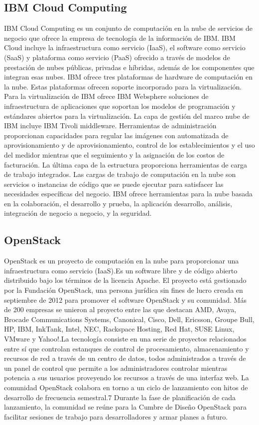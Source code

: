 \subsection{IBM Cloud Computing}
IBM Cloud Computing es un conjunto de computación en la nube de servicios de negocio que ofrece la empresa de tecnología de la información de IBM. IBM Cloud incluye la infraestructura como servicio (IaaS), el software como servicio (SaaS) y plataforma como servicio (PaaS) ofrecido a través de modelos de prestación de nubes públicas, privadas e híbridas, además de los componentes que integran esas nubes.
IBM ofrece tres plataformas de hardware de computación en la nube. Estas plataformas ofrecen soporte incorporado para la virtualización. Para la virtualización de IBM ofrece IBM Websphere soluciones de infraestructura de aplicaciones que soportan los modelos de programación y estándares abiertos para la virtualización.
La capa de gestión del marco nube de IBM incluye IBM Tivoli middleware. Herramientas de administración proporcionan capacidades para regular las imágenes con automatizada de aprovisionamiento y de aprovisionamiento, control de los establecimientos y el uso del medidor mientras que el seguimiento y la asignación de los costos de facturación. La última capa de la estructura proporciona herramientas de carga de trabajo integrados. Las cargas de trabajo de computación en la nube son servicios o instancias de código que se puede ejecutar para satisfacer las necesidades específicas del negocio. IBM ofrece herramientas para la nube basada en la colaboración, el desarrollo y prueba, la aplicación desarrollo, análisis, integración de negocio a negocio, y la seguridad.

\subsection{OpenStack}
OpenStack es un proyecto de computación en la nube para proporcionar una infraestructura como servicio (IaaS).Es un software libre y de código abierto distribuido bajo los términos de la licencia Apache. El proyecto está gestionado por la Fundación OpenStack, una persona jurídica sin fines de lucro creada en septiembre de 2012 para promover el software OpenStack y su comunidad.
Más de 200 empresas se unieron al proyecto entre las que destacan AMD, Avaya, Brocade Communications Systems, Canonical, Cisco, Dell, Ericsson, Groupe Bull, HP, IBM, InkTank, Intel, NEC, Rackspace Hosting, Red Hat, SUSE Linux, VMware y Yahoo!.La tecnología consiste en una serie de proyectos relacionados entre sí que controlan estanques de control de procesamiento, almacenamiento y recursos de red a través de un centro de datos, todos administrados a través de un panel de control que permite a los administradores controlar mientras potencia a sus usuarios proveyendo los recursos a través de una interfaz web. La comunidad OpenStack colabora en torno a un ciclo de lanzamiento con hitos de desarrollo de frecuencia semestral.7 Durante la fase de planificación de cada lanzamiento, la comunidad se reúne para la Cumbre de Diseño OpenStack para facilitar sesiones de trabajo para desarrolladores y armar planes a futuro.

